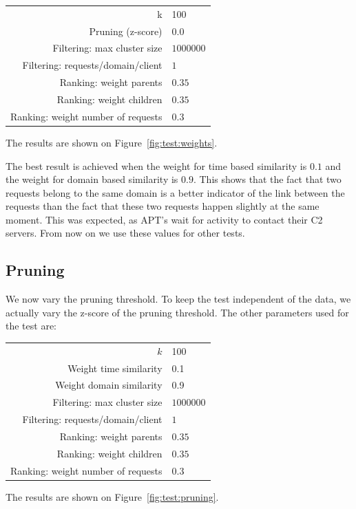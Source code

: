 \documentclass[conference]{IEEEtran}
\begin{document}
{\small
  \begin{tabularx}{\linewidth}{rl}
  \hline
  k & 100 \\
  Pruning (z-score) & 0.0 \\
  Filtering: max cluster size & $1000000$ \\ 
  Filtering: requests/domain/client & $1$ \\ 
  Ranking: weight parents & $0.35$ \\ 
  Ranking: weight children & $0.35$ \\ 
  Ranking: weight number of requests & $0.3$ \\
  \hline
  \end{tabularx}
}

The results are shown on Figure~\ref{fig:test:weights}.

The best result is achieved when the weight for time based similarity is $0.1$ and the weight for domain based similarity is $0.9$. This shows that the fact that two requests belong to the same domain is a better indicator of the link between the requests than the fact that these two requests happen slightly at the same moment. This was expected, as APT's wait for activity to contact their C2 servers. From now on we use these values for other tests.

\subsection{Pruning}

We now vary the pruning threshold. To keep the test independent of the data, we actually vary the z-score of the pruning threshold. The other parameters used for the test are:

{\small
\begin{tabularx}{\linewidth}{rl}
\hline
$k$ & 100 \\
Weight time similarity & 0.1 \\ 
Weight domain similarity & 0.9 \\
Filtering: max cluster size & $1000000$ \\ 
Filtering: requests/domain/client & $1$ \\ 
Ranking: weight parents & $0.35$ \\ 
Ranking: weight children & $0.35$ \\ 
Ranking: weight number of requests & $0.3$ \\
\hline
\end{tabularx}
}

The results are shown on Figure~\ref{fig:test:pruning}.
\end{document}
